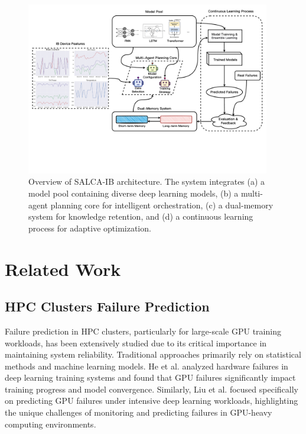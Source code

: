 \documentclass[conference]{IEEEtran}
\begin{document}
\begin{figure}[htbp]
    \centering
    \includegraphics[width=0.95\textwidth]{fig/agent.pdf}
    \caption{Overview of SALCA-IB architecture. The system integrates (a) a model pool containing diverse deep learning models, (b) a multi-agent planning core for intelligent orchestration, (c) a dual-memory system for knowledge retention, and (d) a continuous learning process for adaptive optimization.}
    \label{fig:salca-ib}
\end{figure}


\section{Related Work}

\subsection{HPC Clusters Failure Prediction}
Failure prediction in HPC clusters, particularly for large-scale GPU training workloads, has been extensively studied due to its critical importance in maintaining system reliability. Traditional approaches primarily rely on statistical methods and machine learning models. He et al. \cite{b6} analyzed hardware failures in deep learning training systems and found that GPU failures significantly impact training progress and model convergence. Similarly, Liu et al. \cite{b8} focused specifically on predicting GPU failures under intensive deep learning workloads, highlighting the unique challenges of monitoring and predicting failures in GPU-heavy computing environments.
\end{document}

